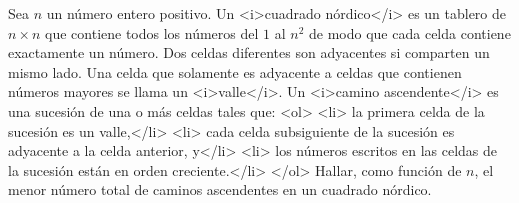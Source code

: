 Sea $n$ un número entero positivo. Un <i>cuadrado nórdico</i> es un tablero de $n\times n$ que contiene todos los números del $1$ al $n^2$ de modo que cada celda contiene exactamente un número. Dos celdas diferentes son adyacentes si comparten un mismo lado. Una celda que solamente es adyacente a celdas que contienen números mayores se llama un <i>valle</i>. Un <i>camino ascendente</i> es una sucesión de una o más celdas tales que:
<ol>
<li> la primera celda de la sucesión es un valle,</li>
<li> cada celda subsiguiente de la sucesión es adyacente a la celda anterior, y</li>
<li> los números escritos en las celdas de la sucesión están en orden creciente.</li>
</ol>
Hallar, como función de $n$, el menor número total de caminos ascendentes en un cuadrado nórdico.